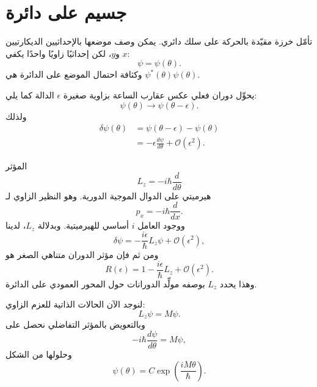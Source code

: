 \section{جسيم على دائرة}

تأمّل خرزة مقيّدة بالحركة على سلك دائري. يمكن وصف موضعها بالإحداثيين الديكارتيين \(x\) و\(y\)، لكن إحداثيًا زاويًا واحدًا يكفي:
\begin{equation}
\psi=\psi(\theta).
\end{equation}
وكثافة احتمال الموضع على الدائرة هي \(\psi^*(\theta)\psi(\theta)\).

يحوِّل دوران فعلي عكس عقارب الساعة بزاوية صغيرة \(\epsilon\) الدالة كما يلي:
\begin{equation}
\psi(\theta)\longrightarrow\psi(\theta-\epsilon).
\end{equation}
ولذلك
\begin{align}
\delta\psi(\theta)
&=\psi(\theta-\epsilon)-\psi(\theta)\\
&=-\epsilon\frac{d\psi}{d\theta}
+\mathcal O(\epsilon^2).
\end{align}

المؤثر
\begin{equation}
L_z=-i\hbar\frac{d}{d\theta}
\end{equation}
هيرميتي على الدوال الموجية الدورية. وهو النظير الزاوي لـ
\begin{equation}
p_x=-i\hbar\frac{d}{dx}.
\end{equation}
ووجود العامل \(i\) أساسي للهيرميتية. وبدلالة \(L_z\)، لدينا
\begin{equation}
\delta\psi
=-\frac{i\epsilon}{\hbar}L_z\psi
+\mathcal O(\epsilon^2),
\end{equation}
ومن ثم فإن مؤثر الدوران متناهي الصغر هو
\begin{equation}
R(\epsilon)
=1-\frac{i\epsilon}{\hbar}L_z
+\mathcal O(\epsilon^2).
\end{equation}
وهذا يحدد \(L_z\) بوصفه مولِّد الدورانات حول المحور العمودي على الدائرة.

\begin{classroomqa}
\end{classroomqa}

لنوجد الآن الحالات الذاتية للعزم الزاوي:
\begin{equation}
L_z\psi=M\psi.
\end{equation}
وبالتعويض بالمؤثر التفاضلي نحصل على
\begin{equation}
-i\hbar\frac{d\psi}{d\theta}=M\psi,
\end{equation}
وحلولها من الشكل
\begin{equation}
\psi(\theta)=C\exp\left(\frac{iM\theta}{\hbar}\right).
\end{equation}


